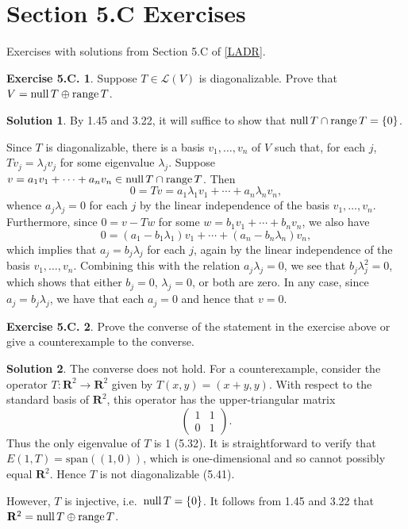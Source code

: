 \documentclass[12pt]{article}
\theoremstyle{definition}
\theoremstyle{exercise}
\newtheorem{exercise}{Exercise 5.C.}
\theoremstyle{solution}
\newtheorem*{solution}{Solution}
\newcommand{\lmap}{\mathcal{L}}
\newcommand{\Span}{\text{span}}
\newcommand{\Null}{\text{null\,}}
\newcommand{\Range}{\text{range\,}}
\newcommand{\R}{\mathbf{R}}
\begin{document}
\section{Section 5.C Exercises}

Exercises with solutions from Section 5.C of \hyperlink{ladr}{[LADR]}.

\begin{exercise}
\label{ex:1}
    Suppose \( T \in \lmap(V) \) is diagonalizable. Prove that \( V = \Null T \oplus \Range T \).
\end{exercise}

\begin{solution}
    By 1.45 and 3.22, it will suffice to show that \( \Null T \cap \Range T = \{ 0 \} \).

    Since \( T \) is diagonalizable, there is a basis \( v_1, \ldots, v_n \) of \( V \) such that, for each \( j \), \( Tv_j = \lambda_j v_j \) for some eigenvalue \( \lambda_j \). Suppose \( v = a_1 v_1 + \cdots + a_n v_n \in \Null T \cap \Range T \). Then
    \[
        0 = Tv = a_1 \lambda_1 v_1 + \cdots + a_n \lambda_n v_n,
    \]
    whence \( a_j \lambda_j = 0 \) for each \( j \) by the linear independence of the basis \( v_1, \ldots, v_n \). Furthermore, since \( 0 = v - Tw \) for some \( w = b_1 v_1 + \cdots + b_n v_n \), we also have
    \[
        0 = (a_1 - b_1 \lambda_1) v_1 + \cdots + (a_n - b_n \lambda_n) v_n,
    \]
    which implies that \( a_j = b_j \lambda_j \) for each \( j \), again by the linear independence of the basis \( v_1, \ldots, v_n \). Combining this with the relation \( a_j \lambda_j = 0 \), we see that \( b_j \lambda_j^2 = 0 \), which shows that either \( b_j = 0 \), \( \lambda_j = 0 \), or both are zero. In any case, since \( a_j = b_j \lambda_j \), we have that each \( a_j = 0 \) and hence that \( v = 0 \).
\end{solution}

\begin{exercise}
\label{ex:2}
    Prove the converse of the statement in the exercise above or give a counterexample to the converse.
\end{exercise}

\begin{solution}
    The converse does not hold. For a counterexample, consider the operator \( T : \R^2 \to \R^2 \) given by \( T(x, y) = (x + y, y) \). With respect to the standard basis of \( \R^2 \), this operator has the upper-triangular matrix
    \[
        \begin{pmatrix}
            1 & 1 \\
            0 & 1
        \end{pmatrix}.
    \]
    Thus the only eigenvalue of \( T \) is 1 (5.32). It is straightforward to verify that \( E(1, T) = \Span((1, 0)) \), which is one-dimensional and so cannot possibly equal \( \R^2 \). Hence \( T \) is not diagonalizable (5.41).

    However, \( T \) is injective, i.e.\ \( \Null T = \{ 0 \} \). It follows from 1.45 and 3.22 that \( \R^2 = \Null T \oplus \Range T \).
\end{solution}
\end{document}
